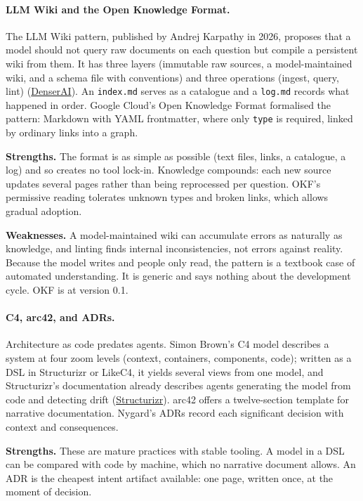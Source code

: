 \documentclass[11pt]{article}
\begin{document}
\paragraph{LLM Wiki and the Open Knowledge Format.} The LLM Wiki pattern, published by Andrej Karpathy in 2026, proposes that a model should not query raw documents on each question but compile a persistent wiki from them. It has three layers (immutable raw sources, a model-maintained wiki, and a schema file with conventions) and three operations (ingest, query, lint) (\href{https://denser.ai/blog/llm-wiki-karpathy-knowledge-base/}{DenserAI}). An \texttt{index.md} serves as a catalogue and a \texttt{log.md} records what happened in order. Google Cloud's Open Knowledge Format formalised the pattern: Markdown with YAML frontmatter, where only \texttt{type} is required, linked by ordinary links into a graph.

\textbf{Strengths.} The format is as simple as possible (text files, links, a catalogue, a log) and so creates no tool lock-in. Knowledge compounds: each new source updates several pages rather than being reprocessed per question. OKF's permissive reading tolerates unknown types and broken links, which allows gradual adoption.

\textbf{Weaknesses.} A model-maintained wiki can accumulate errors as naturally as knowledge, and linting finds internal inconsistencies, not errors against reality. Because the model writes and people only read, the pattern is a textbook case of automated understanding. It is generic and says nothing about the development cycle. OKF is at version 0.1.

\paragraph{C4, arc42, and ADRs.} Architecture as code predates agents. Simon Brown's C4 model describes a system at four zoom levels (context, containers, components, code); written as a DSL in Structurizr or LikeC4, it yields several views from one model, and Structurizr's documentation already describes agents generating the model from code and detecting drift (\href{https://docs.structurizr.com/as-code}{Structurizr}). arc42 offers a twelve-section template for narrative documentation. Nygard's ADRs record each significant decision with context and consequences.

\textbf{Strengths.} These are mature practices with stable tooling. A model in a DSL can be compared with code by machine, which no narrative document allows. An ADR is the cheapest intent artifact available: one page, written once, at the moment of decision.
\end{document}
